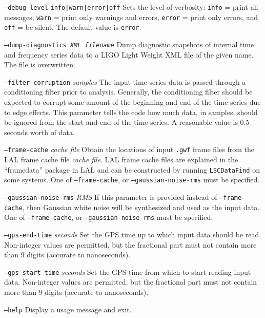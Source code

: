 \documentclass[10pt]{article}
\newcommand{\prog}[1]{\texttt{#1}}
\newcommand{\option}[1]{\texttt{#1}}
\newcommand{\parm}[1]{\textit{#1}}
\newenvironment{entry}%
{\begin{list}{}{\renewcommand{\makelabel}[1]%
{\parbox[b]{\labelwidth}{\makebox[0pt][l]{\textbf{##1}}\\}}%
\setlength{\labelwidth}{1em}%
\setlength{\labelsep}{1em}%
\setlength{\leftmargin}{2em}%
\setlength{\topsep}{\medskipamount}%
\setlength{\itemsep}{\medskipamount}%
\setlength{\parsep}{\medskipamount}%
\setlength{\listparindent}{0pt}}}
{\end{list}}
\begin{document}
\begin{entry}
\begin{entry}
\item[\option{--debug-level} \option{info|warn|error|off}]
Sets the level of verbosity:  \option{info} = print all messages,
\option{warn} = print only warnings and errors, \option{error} = print only
errors, and \option{off} = be silent.  The default value is \option{error}.

\item[\option{--dump-diagnostics \parm{XML filename}}]
Dump diagnostic snapshots of internal time and frequency series data to a
LIGO Light Weight XML file of the given name.  The file is overwritten.

\item[\option{--filter-corruption} \parm{samples}]
The input time series data is passed through a conditioning filter prior to
analysis.  Generally, the conditioning filter should be expected to corrupt
some amount of the beginning and end of the time series due to edge
effects.  This parameter tells the code how much data, in samples, should
be ignored from the start and end of the time series.  A reasonable value
is 0.5 seconds worth of data.

\item[\option{--frame-cache} \parm{cache file}]
Obtain the locations of input \texttt{.gwf} frame files from the LAL frame
cache file \parm{cache file}.  LAL frame cache files are explained in the
``framedata'' package in LAL and can be constructed by running
\prog{LSCDataFind} on some systems.  One of \option{--frame-cache}, or
\option{--gaussian-noise-rms} must be specified.

\item[\option{--gaussian-noise-rms} \parm{RMS}]
If this parameter is provided instead of \option{--frame-cache}, then
Gaussian white noise will be synthesized and used as the input data.  One
of \option{--frame-cache}, or \option{--gaussian-noise-rms} must be
specified.

\item[\option{--gps-end-time} \parm{seconds}]
Set the GPS time up to which input data should be read.  Non-integer values
are permitted, but the fractional part must not contain more than 9 digits
(accurate to nanoseconds).

\item[\option{--gps-start-time} \parm{seconds}]
Set the GPS time from which to start reading input data.  Non-integer
values are permitted, but the fractional part must not contain more than 9
digits (accurate to nanoseconds).

\item[\option{--help}]
Display a usage message and exit.


\end{entry}
\end{entry}
\end{document}
